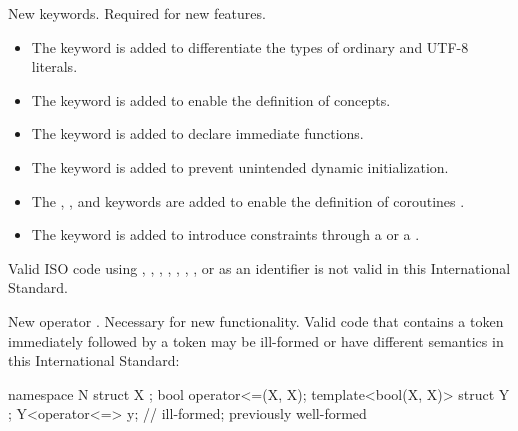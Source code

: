 \change
New keywords.
\rationale
Required for new features.
\begin{itemize}
\item
The  keyword is added to differentiate
the types of ordinary and UTF-8 literals.
\item
The  keyword is
added to enable the definition of concepts.
\item
The  keyword is added to
declare immediate functions.
\item
The  keyword is added to
prevent unintended dynamic initialization.
\item
The , , and  keywords are added
to enable the definition of coroutines .
\item
The  keyword is added
to introduce constraints through a 
or a .
\end{itemize}
\effectafteritemize
Valid ISO \CppXVII{} code using
,
,
,
,
, , ,
or 
as an identifier is not valid in this International Standard.

\change
New operator \tcode{<=>}.
\rationale
Necessary for new functionality.
\effect
Valid \CppXVII{} code that contains a \tcode{<=} token
immediately followed by a \tcode{>} token
may be ill-formed or have different semantics in this International Standard:
\begin{codeblock}
namespace N {
  struct X {};
  bool operator<=(X, X);
  template<bool(X, X)> struct Y {};
  Y<operator<=> y;              // ill-formed; previously well-formed
}
\end{codeblock}

